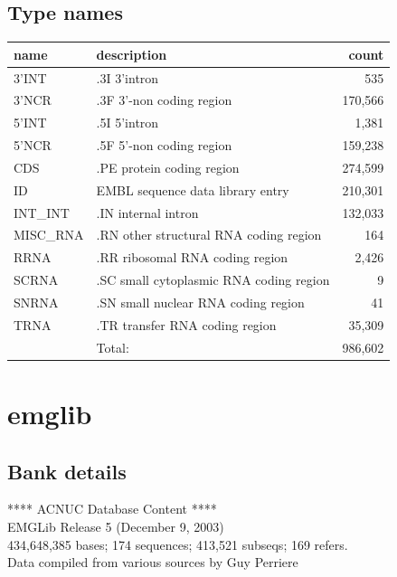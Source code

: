 \documentclass{article}
\begin{document}
\begin{Schunk}
\subsection{Type names}
\noindent\begin{tabular}{llr}
\hline \hline
name & description & count \\
\hline
3'INT  &  .3I 3'intron  &  535 \\
3'NCR  &  .3F  3'-non coding region  &  170,566 \\
5'INT  &  .5I 5'intron  &  1,381 \\
5'NCR  &  .5F  5'-non coding region  &  159,238 \\
CDS  &  .PE protein coding region  &  274,599 \\
ID  &  EMBL sequence data library entry  &  210,301 \\
INT\_INT  &  .IN  internal intron  &  132,033 \\
MISC\_RNA  &  .RN other structural RNA coding region  &  164 \\
RRNA  &  .RR ribosomal RNA coding region  &  2,426 \\
SCRNA  &  .SC small cytoplasmic RNA coding region  &  9 \\
SNRNA  &  .SN small nuclear RNA coding region  &  41 \\
TRNA  &  .TR transfer RNA coding region  &  35,309 \\
\hline
 & Total: & 986,602 \\
\hline \hline
\end{tabular}

\section{ emglib }
\subsection{Bank details}
               ****     ACNUC Database Content      ****\\
                  EMGLib Release 5 (December 9, 2003)\\
434,648,385 bases; 174 sequences; 413,521 subseqs; 169 refers.\\
           Data compiled from various sources by Guy Perriere


\end{Schunk}
\end{document}
